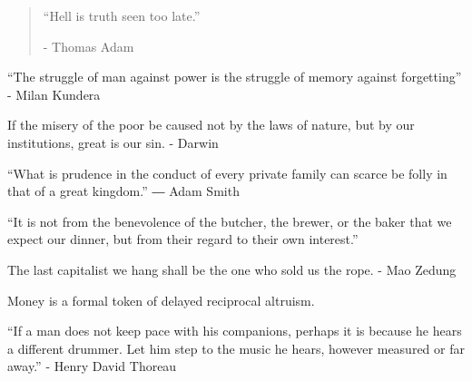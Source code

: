 \vspace{-1.3cm}
\begin{localsize}{10}
	\begin{quote}
	“Hell is truth seen too late.”
	\begin{flushright}- Thomas Adam \end{flushright}
	\end{quote} 
\end{localsize}
\vspace{1cm}


“The struggle of man against power is the struggle of memory against forgetting” - Milan Kundera

If the misery of the poor be caused not by the laws of nature, but by our institutions, great is our sin. - Darwin

“What is prudence in the conduct of every private family can scarce be folly in that of a great kingdom.”
― Adam Smith


“It is not from the benevolence of the butcher, the brewer, or the baker that we expect our dinner, but from their regard to their own interest.”

The last capitalist we hang shall be the one who sold us the rope. - Mao Zedung

Money is a formal token of delayed reciprocal altruism.







 “If a man does not keep pace with his companions, perhaps it is because he hears a different drummer. Let him step to the music he hears, however measured or far away.” - Henry David Thoreau

